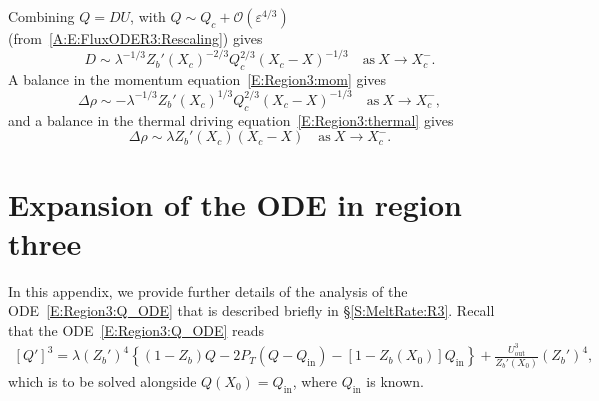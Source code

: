 \documentclass{jfm}
\newcommand{\order}[1]{\mathcal{O}(#1)}
\newcommand{\Pt}{\textit{P}_T}
\renewcommand{\in}{\text{in}} %
\newcommand{\out}{\text{out}}
\begin{document}
Combining $Q = DU$, with $Q \sim Q_c + \order{\varepsilon^{4/3}}$ (from~\eqref{A:E:FluxODER3:Rescaling}) gives
\begin{equation}
D \sim \lambda^{-1/3}Z_b'(X_c)^{-2/3}Q_c^{2/3}(X_c - X)^{-1/3} \quad \text{as}~X \to X_c^-.
\end{equation}
A balance in the momentum equation~\eqref{E:Region3:mom} gives
\begin{equation}
\Delta \rho \sim -\lambda^{-1/3} Z_b'(X_c)^{1/3} Q_c^{2/3}(X_c - X)^{-1/3} \quad \text{as}~X \to X_c^-,
\end{equation}
and a balance in the thermal driving equation~\eqref{E:Region3:thermal} gives
\begin{equation}
 \Delta \rho \sim  \lambda Z_b'(X_c) (X_c - X) \quad \text{as}~X \to X_c^-.
 \end{equation}

\section{Expansion of the ODE in region three}\label{A:Expansion}
In this appendix, we provide further details of the analysis of the ODE~\eqref{E:Region3:Q_ODE} that is described briefly in \S\ref{S:MeltRate:R3}. Recall that the ODE~\eqref{E:Region3:Q_ODE} reads
\begin{multline}\label{A:Expansion:Q_ODE}
\left[Q'\right]^3 =\lambda \left(Z_b'\right)^4 \left\{\left(1 - Z_b\right)Q - 2\Pt\left(Q - Q_\in\right) -\left[1 - Z_b(X_0)\right]Q_\in\right\} + \frac{U_\out^3}{Z_b'(X_0)}\left(Z_b'\right)^4, 
\end{multline}
which is to be solved alongside $Q(X_0) = Q_\in$, where $Q_\in$ is known. 
\end{document}

